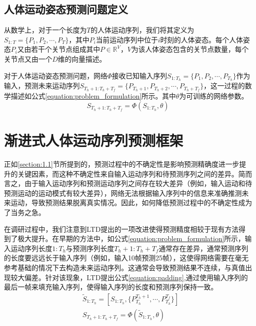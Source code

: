 \subsection{人体运动姿态预测问题定义}
从数学上，对于一个长度为$T$的人体运动序列，我们将其定义为$S_{1:T} = \{P_1,P_2,\cdots,P_{T}\}$，其中$P_i$当前运动序列中位于$i$时刻的人体姿态。每个人体姿态$P_i$又由若干个关节点组成其中$P \in \mathbb{R}^V$，$V$为该人体姿态包含的关节点数量，每个关节点又由一个$D$维的向量描述。

对于人体运动姿态预测问题，网络$\Phi$接收已知输入序列$S_{1:T_h} = \{P_1,P_2,\cdots,P_{T_h}\}$作为输入，预测未来运动序列$S_{T_h+1:T_h+T_f} = \{P_{T_h+1},P_{T_h+2},\cdots,P_{T_h+T_f}\}$，这一过程的数学描述如公式\ref{equation:problem_formulation}所示。其中$\theta$为可训练的网络参数。
\begin{equation}
    S_{T_h+1:T_h+T_f} = \Phi(S_{1:T_h}, \theta) \label{equation:problem_formulation}
\end{equation}

\section{渐进式人体运动序列预测框架}
正如\ref{section:1.1}节所提到的，预测过程中的不确定性是影响预测精确度进一步提升的关键因素，而这种不确定性来自输入运动序列和待预测序列之间的差异。简而言之，由于输入运动序列和预测运动序列之间存在较大差异（例如，输入运动和待预测运动的运动模式有较大差异），网络无法根据输入序列中的信息来准确推测未来运动，导致预测结果脱离真实情况。因此，如何降低预测过程中的不确定性成为了当务之急。

在调研过程中，我们注意到LTD\parencite{mao2019learning}提出的一项改进使得预测精度相较于现有方法得到了极大提升。在早期的方法中，如公式\ref{equation:problem_formulation}所示，输入运动序列长度$1:T_h$与预测序列长度$T_h+1:T_h+T_f$通常存在差异，通常预测序列的长度要远远长于输入序列（例如，输入10帧预测25帧），这使得网络需要在毫无参考基础的情况下去构造未来运动序列。这通常会导致预测结果不连续，与真值出现较大偏差。针对该现象，LTD\parencite{mao2019learning}提出公式\ref{equation:padding},通过使用输入序列的最后一帧来填充输入序列，使得输入序列的长度和预测序列保持一致。
\begin{equation}
    \begin{aligned}
        &\widetilde{S}_{1:T_h} = [S_{1:T_h}, \{P^{T_h+1}_{T_h}, \cdots, P^{T_f}_{T_h} \} ]
        \\
        &S_{T_h+1:T_h+T_f} = \Phi(\widetilde{S}_{1:T_h}, \theta)
    \end{aligned}
    \label{equation:padding}
\end{equation}

